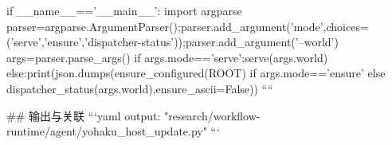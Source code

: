 if __name__=='__main__':
 import argparse
 parser=argparse.ArgumentParser();parser.add_argument('mode',choices=('serve','ensure','dispatcher-status'));parser.add_argument('--world')
 args=parser.parse_args()
 if args.mode=='serve':serve(args.world)
 else:print(json.dumps(ensure_configured(ROOT) if args.mode=='ensure' else dispatcher_status(args.world),ensure_ascii=False))
````

## 输出与关联
```yaml
output: "research/workflow-runtime/agent/yohaku_host_update.py"
```
